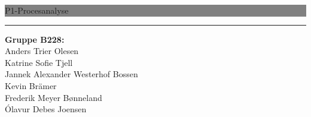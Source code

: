 \newcommand{\HRule}[1]{\hfill \rule{0.2\linewidth}{#1}} 

\thispagestyle{empty} 

\noindent \colorbox{grey}{
	 \parbox[t]{1.0\linewidth}{
		\centering \fontsize{50pt}{80pt}\selectfont
		\vspace*{0.7cm}
		P1-Procesanalyse \\[3pt]
		\vspace*{0.7cm}
	}
}

\vfill
\flushright
\flushright \rule[10pt]{0.1pt}{160pt}  \begin{minipage}[b]{0.45\linewidth}
{
\Large
\textbf{Gruppe B228:} \\[4pt]
Anders Trier Olesen\\[.2cm]
Katrine Sofie Tjell\\[.2cm]
Jannek Alexander Westerhof Bossen\\[.2cm]
Kevin Brämer\\[.2cm]
Frederik Meyer Bønneland\\[.2cm]
Ólavur Debes Joensen\\[.2cm]
}
\end{minipage}

\clearpage 
